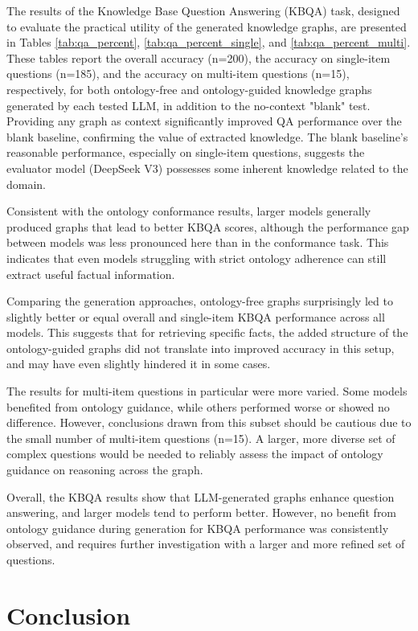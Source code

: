 \documentclass[a4, conference]{IEEEtran}
\begin{document}
The results of the Knowledge Base Question Answering (KBQA) task, designed to evaluate the practical utility of the generated knowledge graphs, are presented in Tables \ref{tab:qa_percent}, \ref{tab:qa_percent_single}, and \ref{tab:qa_percent_multi}. These tables report the overall accuracy (n=200), the accuracy on single-item questions (n=185), and the accuracy on multi-item questions (n=15), respectively, for both ontology-free and ontology-guided knowledge graphs generated by each tested LLM, in addition to the no-context "blank" test. Providing any graph as context significantly improved QA performance over the blank baseline, confirming the value of extracted knowledge. The blank baseline's reasonable performance, especially on single-item questions, suggests the evaluator model (DeepSeek V3) possesses some inherent knowledge related to the domain.

Consistent with the ontology conformance results, larger models generally produced graphs that lead to better KBQA scores, although the performance gap between models was less pronounced here than in the conformance task. This indicates that even models struggling with strict ontology adherence can still extract useful factual information.

Comparing the generation approaches, ontology-free graphs surprisingly led to slightly better or equal overall and single-item KBQA performance across all models. This suggests that for retrieving specific facts, the added structure of the ontology-guided graphs did not translate into improved accuracy in this setup, and may have even slightly hindered it in some cases.

The results for multi-item questions in particular were more varied. Some models benefited from ontology guidance, while others performed worse or showed no difference. However, conclusions drawn from this subset should be cautious due to the small number of multi-item questions (n=15). A larger, more diverse set of complex questions would be needed to reliably assess the impact of ontology guidance on reasoning across the graph.

Overall, the KBQA results show that LLM-generated graphs enhance question answering, and larger models tend to perform better. However, no benefit from ontology guidance during generation for KBQA performance was consistently observed, and requires further investigation with a larger and more refined set of questions.

\section{Conclusion}
\end{document}
